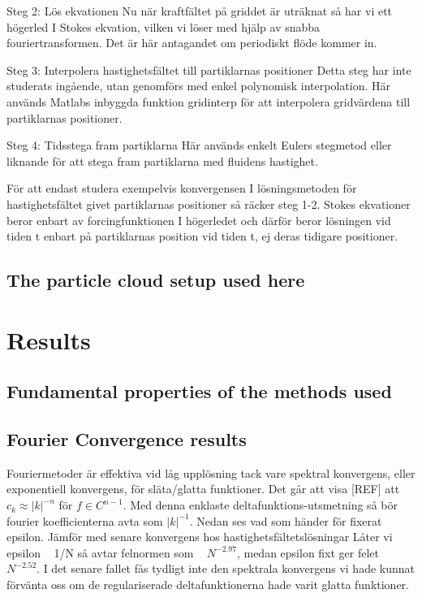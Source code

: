 \documentclass[a4paper,twoside=false,abstract=false,numbers=noenddot,
titlepage=false,headings=small,parskip=half,version=last]{scrartcl}
\begin{document}
Steg 2: Lös ekvationen
Nu när kraftfältet på griddet är uträknat så har vi ett högerled I Stokes ekvation, vilken vi löser med hjälp av snabba fouriertransformen. Det är här antagandet om periodiskt flöde kommer in.

Steg 3: Interpolera hastighetsfältet till partiklarnas positioner
Detta steg har inte studerats ingående, utan genomförs med enkel polynomisk interpolation. Här används Matlabs inbyggda funktion gridinterp för att interpolera gridvärdena till partiklarnas positioner.

Steg 4: Tidsstega fram partiklarna
Här används enkelt Eulers stegmetod eller liknande för att stega fram partiklarna med fluidens hastighet.

För att endast studera exempelvis konvergensen I lösningsmetoden för hastighetsfältet givet partiklarnas positioner så räcker steg 1-2. Stokes ekvationer beror enbart av forcingfunktionen I högerledet och därför beror lösningen vid tiden t enbart på partiklarnas position vid tiden t, ej deras tidigare positioner.

\subsection{The particle cloud setup used here}

\section{Results}

\subsection{Fundamental properties of the methods used}
\subsection{Fourier Convergence results}
Fouriermetoder är effektiva vid låg upplösning tack vare spektral konvergens, eller exponentiell konvergens, för släta/glatta funktioner. Det går att visa [REF] att $c_k \approx |k|^{-n}$ för $f \in C^{n-1}$.
Med denna enklaste deltafunktions-utsmetning så bör fourier koefficienterna avta som $|k|^{-1}$.
Nedan ses vad som händer för fixerat epsilon. Jämför med senare 
konvergens hos hastighetsfältetslösningar
Låter vi epsilon ~ 1/N så avtar felnormen som ~ $N^{-2.97}$, medan epsilon fixt ger felet ~ $N^{-2.52}$. I det senare fallet fås tydligt inte den spektrala konvergens vi hade kunnat förvänta oss om de regulariserade deltafunktionerna hade varit glatta funktioner.
\end{document}
